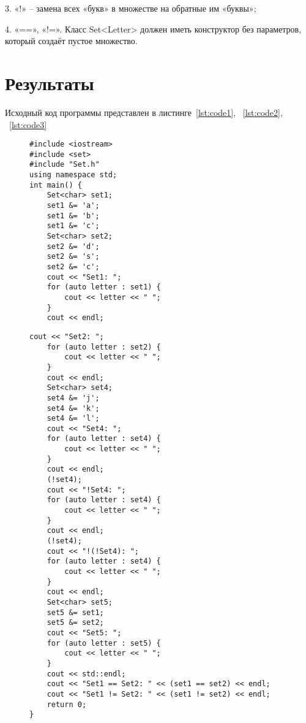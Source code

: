 \documentclass[a4paper, 14pt]{extarticle}
\begin{document}
    3. «!» – замена всех «букв» в множестве на обратные им «буквы»;
    
    4. «==», «!=». Класс Set<Letter> должен иметь конструктор без параметров, который создаёт пустое множество.
\section{Результаты}\label{Sect::res}

Исходный код программы представлен в листинге~\ref{lst:code1}, ~\ref{lst:code2}, ~\ref{lst:code3}

\begin{figure}[!htb]
\begin{lstlisting}[language={},caption={main.cpp},label={lst:code1}]
#include <iostream>
#include <set>
#include "Set.h"
using namespace std;
int main() {
    Set<char> set1;
    set1 &= 'a';
    set1 &= 'b';
    set1 &= 'c';
    Set<char> set2;
    set2 &= 'd';
    set2 &= 's';
    set2 &= 'c';
    cout << "Set1: ";
    for (auto letter : set1) {
        cout << letter << " ";
    }
    cout << endl;
\end{lstlisting}
\end{figure}

\begin{figure}[!htb]
\begin{lstlisting}[language={},caption={main.cpp(продолжение)},label={lst:code2}]
    cout << "Set2: ";
    for (auto letter : set2) {
        cout << letter << " ";
    }
    cout << endl;
    Set<char> set4;
    set4 &= 'j';
    set4 &= 'k';
    set4 &= 'l';
    cout << "Set4: ";
    for (auto letter : set4) {
        cout << letter << " ";
    }
    cout << endl;   
    (!set4);    
    cout << "!Set4: ";
    for (auto letter : set4) {
        cout << letter << " ";
    }
    cout << endl;
    (!set4); 
    cout << "!(!Set4): ";
    for (auto letter : set4) {
        cout << letter << " ";
    }
    cout << endl;
    Set<char> set5; 
    set5 &= set1; 
    set5 &= set2; 
    cout << "Set5: ";
    for (auto letter : set5) {
        cout << letter << " ";
    }
    cout << std::endl;
    cout << "Set1 == Set2: " << (set1 == set2) << endl;
    cout << "Set1 != Set2: " << (set1 != set2) << endl;
    return 0;
}
\end{lstlisting}
\end{figure}
\end{document}
